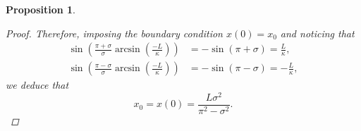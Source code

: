 \documentclass[11pt]{amsart}
\newcommand{\rr}{{\mathbb{R}}}
\renewcommand{\k}{\kappa}
\newtheorem{proposition}[theorem]{Proposition}
\theoremstyle{definition}
\theoremstyle{remark}
\numberwithin{equation}{section}
\begin{document}
\begin{proposition}
\begin{proof}
	Therefore, imposing the boundary condition $x(0)=x_0$ and noticing that
	\begin{align*}
		\sin\left(\frac{\pi+\sigma}{\sigma}\arcsin\left(\frac{-L}{\k}\right)\right)&=-\sin\left(\pi+\sigma\right)=\frac{L}{\k},\\
		\sin\left(\frac{\pi-\sigma}{\sigma}\arcsin\left(\frac{-L}{\k}\right)\right)&=-\sin\left(\pi-\sigma\right)=-\frac{L}{\k},
	\end{align*}
	we deduce that
	\begin{equation}\label{pertrovkinok}
		x_0=x(0)=\frac{L\sigma^2}{\pi^2-\sigma^2}.
	\end{equation}

\end{proof}
\end{proposition}
\end{document}

